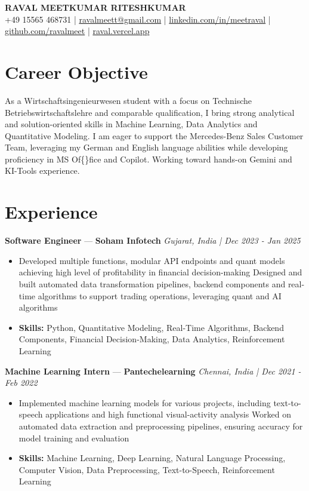 \documentclass[a4paper,10pt]{article}
\begin{document}
\begin{center}
  {\Large\bfseries RAVAL MEETKUMAR RITESHKUMAR}\\[2pt]
  {\small +49 15565 468731 \;|\; \href{mailto:ravalmeett@gmail.com}{ravalmeett@gmail.com} \;|\; \href{https://www.linkedin.com/in/meetraval/}{linkedin.com/in/meetraval} \;|\; \href{https://github.com/ravalmeet}{github.com/ravalmeet} \;|\; \href{https://raval.vercel.app/}{raval.vercel.app}}
\end{center}
\vspace{-3pt}

\section*{Career Objective}
As a Wirtschaftsingenieurwesen student with a focus on Technische Betriebswirtschaftslehre and comparable qualification, I bring strong analytical and solution-oriented skills in Machine Learning, Data Analytics and Quantitative Modeling. I am eager to support the Mercedes-Benz Sales Customer Team, leveraging my German and English language abilities while developing proficiency in MS Of\{\}fice and Copilot. Working toward hands-on Gemini and KI-Tools experience.\par

\section*{Experience}
\textbf{Software Engineer} — \textbf{Soham Infotech} \hfill \textit{Gujarat, India \;|\; Dec 2023 - Jan 2025}\par
\vspace{1pt}
\begin{itemize}
  \item Developed multiple functions, modular API endpoints and quant models achieving high level of profitability in financial decision-making Designed and built automated data transformation pipelines, backend components and real-time algorithms to support trading operations, leveraging quant and AI algorithms
  \item \textbf{Skills:} Python, Quantitative Modeling, Real-Time Algorithms, Backend Components, Financial Decision-Making, Data Analytics, Reinforcement Learning
\end{itemize}
\vspace{3pt}
\textbf{Machine Learning Intern} — \textbf{Pantechelearning} \hfill \textit{Chennai, India \;|\; Dec 2021 - Feb 2022}\par
\vspace{1pt}
\begin{itemize}
  \item Implemented machine learning models for various projects, including text-to-speech applications and high functional visual-activity analysis Worked on automated data extraction and preprocessing pipelines, ensuring accuracy for model training and evaluation
  \item \textbf{Skills:} Machine Learning, Deep Learning, Natural Language Processing, Computer Vision, Data Preprocessing, Text-to-Speech, Reinforcement Learning
\end{itemize}
\end{document}
